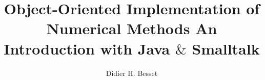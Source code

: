 \documentclass[twoside]{book}
\begin{document}
\title{Object-Oriented Implementation of \linebreak Numerical Methods\linebreak
 An Introduction with Java $\&$ Smalltalk}
\author{Didier H. Besset}
\maketitle {}

{\parskip 0pt \tableofcontents \listoffigures \listoftables
\listoflistings} \cleardoublepage{}












\appendix







\end{document}
